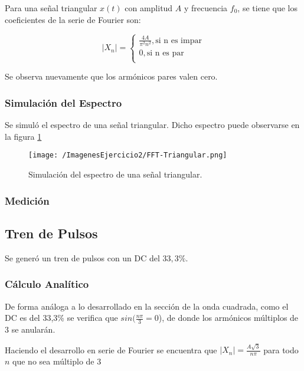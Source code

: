Para una señal triangular $x(t)$ con amplitud $A$ y frecuencia $f_0$, se tiene que los coeficientes de la serie de Fourier son:

\begin{equation}
    |X_n|=
    \begin{cases}
                  \frac{4A}{\pi^2 n^2}, \text{si n es impar}\\ 
                  0, \text{si n es par} \\
     \end{cases}
\end{equation}

Se observa nuevamente que los armónicos pares valen cero. 

\subsubsection{Simulación del Espectro}

Se simuló el espectro de una señal triangular. Dicho espectro puede observarse en la figura \ref{fig:simtriang}

\begin{figure}[H]
	\centering
	\texttt{[image: /ImagenesEjercicio2/FFT-Triangular.png]}
\caption{Simulación del espectro de una señal triangular.}
	\label{fig:simtriang}
\end{figure}


\subsubsection{Medición}

\subsection{Tren de Pulsos}

Se generó un tren de pulsos con un DC del $33,3\%$. 

\subsubsection{Cálculo Analítico}

De forma análoga a lo desarrollado en la sección de la onda cuadrada, como el DC es del 33,3\% se verifica que $sin(\frac{n\pi}{3}=0$), de donde los armónicos múltiplos de $3$ se anularán. 

Haciendo el desarrollo en serie de Fourier se encuentra que $|X_n|=\frac{A\sqrt{3}}{n\pi}$ para todo $n$ que no sea múltiplo de $3$

